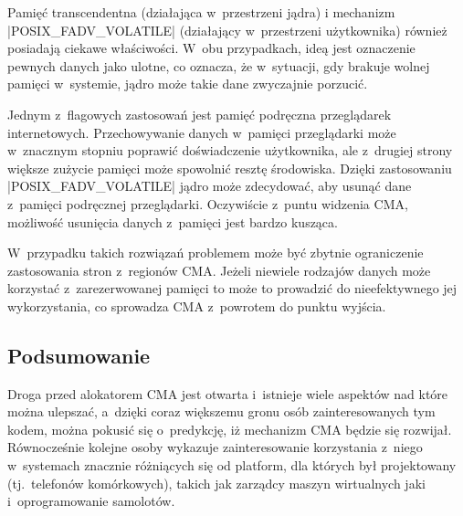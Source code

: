 Pamięć transcendentna \autocite{bib:transcendent} (działająca
w~przestrzeni jądra) i mechanizm \code|POSIX_FADV_VOLATILE|
\autocite{bib:fadv-volatile} (działający w~przestrzeni użytkownika)
również posiadają ciekawe właściwości.  W~obu przypadkach, ideą jest
oznaczenie pewnych danych jako ulotne, co oznacza, że w~sytuacji, gdy
brakuje wolnej pamięci w~systemie, jądro może takie dane zwyczajnie
porzucić.

Jednym z~flagowych zastosowań jest pamięć podręczna przeglądarek
internetowych.  Przechowywanie danych w~pamięci przeglądarki może
w~znacznym stopniu poprawić doświadczenie użytkownika, ale z~drugiej
strony większe zużycie pamięci może spowolnić resztę środowiska.
Dzięki zastosowaniu \code|POSIX_FADV_VOLATILE| jądro może zdecydować,
aby usunąć dane z~pamięci podręcznej przeglądarki.  Oczywiście z~puntu
widzenia CMA, możliwość usunięcia danych z~pamięci jest bardzo
kusząca.

W~przypadku takich rozwiązań problemem może być zbytnie ograniczenie
zastosowania stron z~regionów CMA.  Jeżeli niewiele rodzajów danych
może korzystać z~zarezerwowanej pamięci to może to prowadzić do
nieefektywnego jej wykorzystania, co sprowadza CMA z~powrotem do
punktu wyjścia.

\subsection{Podsumowanie}

Droga przed alokatorem CMA jest otwarta i~istnieje wiele aspektów nad
które można ulepszać, a~dzięki coraz większemu gronu osób
zainteresowanych tym kodem, można pokusić się o~predykcję, iż
mechanizm CMA będzie się rozwijał.  Równocześnie kolejne osoby
wykazuje zainteresowanie korzystania z~niego w~systemach znacznie
różniących się od platform, dla których był projektowany
(tj.\ telefonów komórkowych), takich jak zarządcy maszyn wirtualnych
jaki i~oprogramowanie samolotów.

